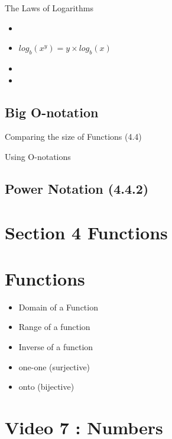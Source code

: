\documentclass[]{report}
\begin{document}
The Laws of Logarithms
\begin{itemize}
\item
\item $log_b(x^y) = y \times log_b(x)$
\item
\item
\end{itemize}

\subsection*{Big O-notation}
Comparing the size of Functions (4.4)


Using O-notations

\subsection*{Power Notation (4.4.2)}






\section{Section 4 Functions}





\section*{Functions}
\begin{itemize}
\item Domain of a Function
\item Range of a function
\item Inverse of a function
\end{itemize}
\begin{itemize}
\item one-one (surjective)
\item onto (bijective)
\end{itemize}






\section{Video 7 : Numbers}
\end{document}
